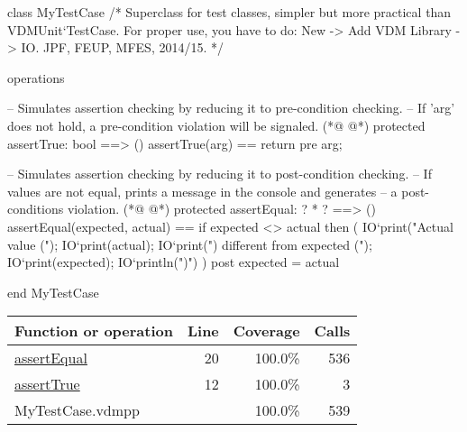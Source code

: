 \begin{vdmpp}[breaklines=true]
class MyTestCase
/*
  Superclass for test classes, simpler but more practical than VDMUnit`TestCase. 
  For proper use, you have to do: New -> Add VDM Library -> IO.
  JPF, FEUP, MFES, 2014/15.
*/

operations

 -- Simulates assertion checking by reducing it to pre-condition checking.
 -- If 'arg' does not hold, a pre-condition violation will be signaled.
(*@
\label{assertTrue:12}
@*)
 protected assertTrue: bool ==> ()
 assertTrue(arg) == 
  return 
 pre arg;
  
 -- Simulates assertion checking by reducing it to post-condition checking.
 -- If values are not equal, prints a message in the console and generates 
 -- a post-conditions violation.
(*@
\label{assertEqual:20}
@*)
 protected assertEqual: ? * ? ==> ()
 assertEqual(expected, actual) == 
  if expected <> actual then (
     IO`print("Actual value (");
     IO`print(actual); 
     IO`print(") different from expected (");
     IO`print(expected);
     IO`println(")\n")
  )
 post expected = actual
  
end MyTestCase
\end{vdmpp}
\bigskip
\begin{longtable}{|l|r|r|r|}
\hline
Function or operation & Line & Coverage & Calls \\
\hline
\hline
\hyperref[assertEqual:20]{assertEqual} & 20&100.0\% & 536 \\
\hline
\hyperref[assertTrue:12]{assertTrue} & 12&100.0\% & 3 \\
\hline
\hline
MyTestCase.vdmpp & & 100.0\% & 539 \\
\hline
\end{longtable}

